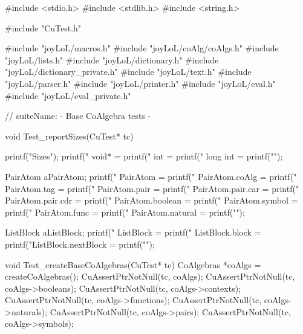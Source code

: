 \starttyping
#include <stdio.h>
#include <stdlib.h>
#include <string.h>

#include "CuTest.h"

#include "joyLoL/macros.h"
#include "joyLoL/coAlg/coAlgs.h"
#include "joyLoL/lists.h"
#include "joyLoL/dictionary.h"
#include "joyLoL/dictionary_private.h"
#include "joyLoL/text.h"
#include "joyLoL/parser.h"
#include "joyLoL/printer.h"
#include "joyLoL/eval.h"
#include "joyLoL/eval_private.h"

// suiteName: - Base CoAlgebra tests -

void Test_reportSizes(CuTest* tc) {
  printf("\nStructure Sizes\n");
  printf("              void* = %
  printf("                int = %
  printf("           long int = %
  printf("\n");

  PairAtom aPairAtom;
  printf("           PairAtom = %
  printf("     PairAtom.coAlg = %
  printf("       PairAtom.tag = %
  printf("      PairAtom.pair = %
  printf("  PairAtom.pair.car = %
  printf("  PairAtom.pair.cdr = %
  printf("   PairAtom.boolean = %
  printf("    PairAtom.symbol = %
  printf("      PairAtom.func = %
  printf("   PairAtom.natural = %
  printf("\n");

  ListBlock aListBlock;
  printf("          ListBlock = %
  printf("    ListBlock.block = %
  printf("ListBlock.nextBlock = %
  printf("\n");
}

void Test_createBaseCoAlgebras(CuTest* tc) {
  CoAlgebras *coAlgs = createCoAlgebras();
  CuAssertPtrNotNull(tc, coAlgs);
  CuAssertPtrNotNull(tc, coAlgs->booleans);
  CuAssertPtrNotNull(tc, coAlgs->contexts);
  CuAssertPtrNotNull(tc, coAlgs->functions);
  CuAssertPtrNotNull(tc, coAlgs->naturals);
  CuAssertPtrNotNull(tc, coAlgs->pairs);
  CuAssertPtrNotNull(tc, coAlgs->symbols);
}
\stoptyping





